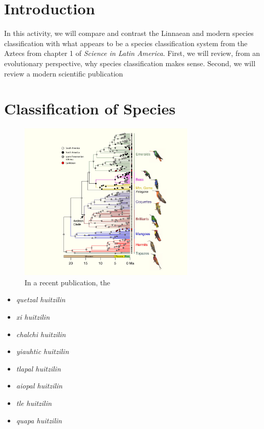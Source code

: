 \documentclass[12pt]{article}
\begin{document}
\maketitle

\section{Introduction}

In this activity, we will compare and contrast the Linnaean and modern species classification with what appears to be a species classification system from the Aztecs from chapter 1 of \textit{Science in Latin America}.  First, we will review, from an evolutionary perspective, why species classification makes sense.  Second, we will review a modern scientific publication \cite{10.1016/j.cub.2014.03.016}

\section{Classification of Species}

\begin{figure}[h]
\centering
\includegraphics[width=0.75\textwidth]{figures/hummingbird.jpg}
\caption{\label{fig:1} In a recent publication, the }
\end{figure}

\begin{itemize}
\item \textit{quetzal huitzilin}
\item \textit{xi huitzilin}
\item \textit{chalchi huitzilin}
\item \textit{yiauhtic huitzilin}
\item \textit{tlapal huitzilin}
\item \textit{aiopal huitzilin}
\item \textit{tle huitzilin}
\item \textit{quapa huitzilin}
\end{itemize}
\end{document}
